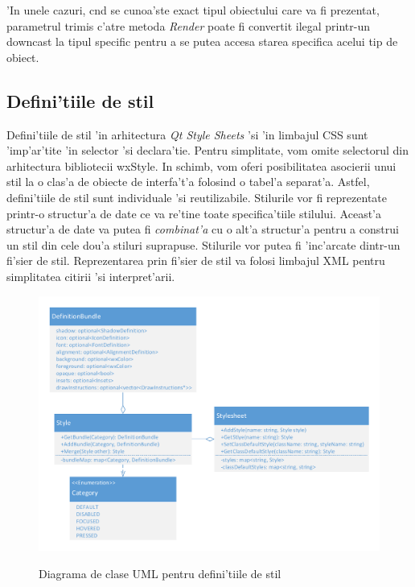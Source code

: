 'In unele cazuri, c{\ia}nd se cunoa'ste exact tipul obiectului care va fi prezentat, parametrul trimis c'atre metoda \emph{Render} poate fi convertit ilegal printr-un downcast la tipul specific pentru a se putea accesa starea specifica acelui tip de obiect.

\subsection{Defini'tiile de stil}

Defini'tiile de stil 'in arhitectura \emph{Qt Style Sheets} 'si 'in limbajul CSS sunt 'imp'ar'tite 'in selector 'si declara'tie. Pentru simplitate, vom omite selectorul din arhitectura bibliotecii wxStyle. In schimb, vom oferi posibilitatea asocierii unui stil la o clas'a de obiecte de interfa't'a folosind o tabel'a separat'a. Astfel, defini'tiile de stil sunt individuale 'si reutilizabile. Stilurile vor fi reprezentate printr-o structur'a de date ce va re'tine toate specifica'tiile stilului. Aceast'a structur'a de date va putea fi \emph{combinat'a} cu o alt'a structur'a pentru a construi un stil din cele dou'a stiluri suprapuse. Stilurile vor putea fi 'inc'arcate dintr-un fi'sier de stil. Reprezentarea prin fi'sier de stil va folosi limbajul XML pentru simplitatea citirii 'si interpret'arii.

\begin{center}
\begin{figure}[h]
    \centering
    \includegraphics[scale=0.8]{img/uml_class_stylesheet.pdf}
    \label{fig0412}
    \caption{Diagrama de clase UML pentru defini'tiile de stil}
\end{figure}
\end{center}

